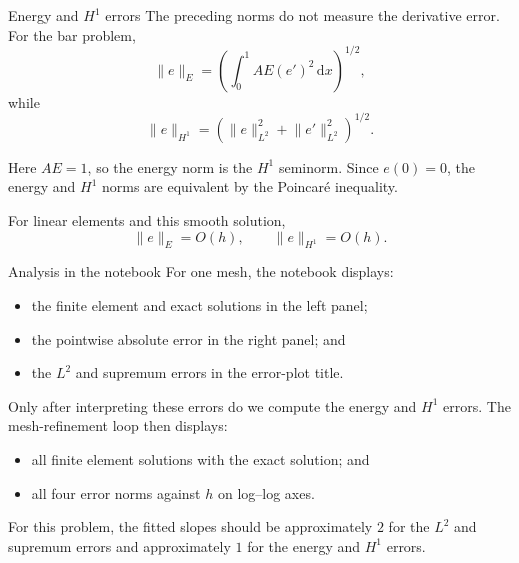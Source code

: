 \documentclass[11pt,aspectratio=169]{beamer}
\newcommand{\dd}{\,\mathrm{d}}
\begin{document}
\begin{frame}{Energy and $H^1$ errors}
The preceding norms do not measure the derivative error. For the bar problem,
\[
  \lVert e\rVert_E
  =\left(\int_0^1AE(e')^2\dd x\right)^{1/2},
\]
while
\[
  \lVert e\rVert_{H^1}
  =\left(\lVert e\rVert_{L^2}^2
  +\lVert e'\rVert_{L^2}^2\right)^{1/2}.
\]

Here $AE=1$, so the energy norm is the $H^1$ seminorm. Since $e(0)=0$,
the energy and $H^1$ norms are equivalent by the Poincar\'e inequality.

For linear elements and this smooth solution,
\[
  \lVert e\rVert_E=O(h),
  \qquad
  \lVert e\rVert_{H^1}=O(h).
\]
\end{frame}

\begin{frame}{Analysis in the notebook}
For one mesh, the notebook displays:
\begin{itemize}
  \item the finite element and exact solutions in the left panel;
  \item the pointwise absolute error in the right panel; and
  \item the $L^2$ and supremum errors in the error-plot title.
\end{itemize}

Only after interpreting these errors do we compute the energy and $H^1$
errors. The mesh-refinement loop then displays:
\begin{itemize}
  \item all finite element solutions with the exact solution; and
  \item all four error norms against $h$ on log--log axes.
\end{itemize}

For this problem, the fitted slopes should be approximately $2$ for the
$L^2$ and supremum errors and approximately $1$ for the energy and $H^1$
errors.
\end{frame}
\end{document}
